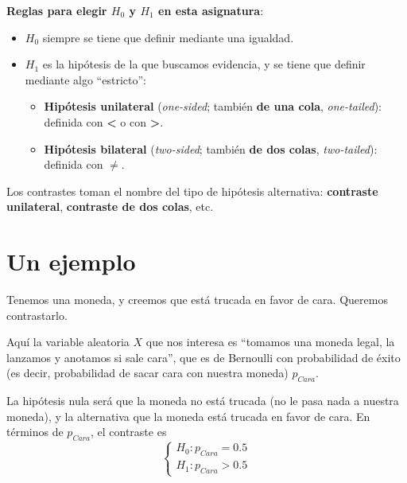 \documentclass[
  spanish,
  letterpaper,
  DIV=11,
  numbers=noendperiod]{scrreprt}
\begin{document}
\begin{tcolorbox}[enhanced jigsaw, arc=.35mm, bottomrule=.15mm, bottomtitle=1mm, breakable, colback=white, colbacktitle=quarto-callout-important-color!10!white, colframe=quarto-callout-important-color-frame, coltitle=black, left=2mm, leftrule=.75mm, opacityback=0, opacitybacktitle=0.6, rightrule=.15mm, title=\textcolor{quarto-callout-important-color}{\faExclamation}\hspace{0.5em}{Importante}, titlerule=0mm, toprule=.15mm, toptitle=1mm]

\textbf{Reglas para elegir \(H_0\) y \(H_1\) en esta asignatura}:

\begin{itemize}
\item
  \(H_0\) siempre se tiene que definir mediante una igualdad.
\item
  \(H_1\) es la hipótesis de la que buscamos evidencia, y se tiene que
  definir mediante algo ``estricto'':

  \begin{itemize}
  \item
    \textbf{Hipótesis unilateral} (\emph{one-sided}; también \textbf{de
    una cola}, \emph{one-tailed}): definida con \textbf{\textless{}} o
    con \textbf{\textgreater{}}.
  \item
    \textbf{Hipótesis bilateral} (\emph{two-sided}; también \textbf{de
    dos colas}, \emph{two-tailed}): definida con \(\mathbf{\neq}\).
  \end{itemize}
\end{itemize}

\end{tcolorbox}

Los contrastes toman el nombre del tipo de hipótesis alternativa:
\textbf{contraste unilateral}, \textbf{contraste de dos colas}, etc.

\section{Un ejemplo}\label{un-ejemplo}

Tenemos una moneda, y creemos que está trucada en favor de cara.
Queremos contrastarlo.

Aquí la variable aleatoria \(X\) que nos interesa es ``tomamos una
moneda legal, la lanzamos y anotamos si sale cara'', que es de Bernoulli
con probabilidad de éxito (es decir, probabilidad de sacar cara con
nuestra moneda) \(p_{\mathit{Cara}}\).

La hipótesis nula será que la moneda no está trucada (no le pasa nada a
nuestra moneda), y la alternativa que la moneda está trucada en favor de
cara. En términos de \(p_{\mathit{Cara}}\), el contraste es \[
\left\{\begin{array}{ll} 
H_{0}:p_{\mathit{Cara}}= 0.5\\ 
H_{1}:p_{\mathit{Cara}}> 0.5
\end{array}
\right.
\]
\end{document}
